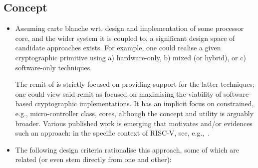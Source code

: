 
\subsection{Concept}
\label{sec:bg:concept}

\begin{itemize}

\item Assuming carte blanche wrt. design and implementation of some processor
      core, and the wider system it is coupled to, a significant design space 
      of candidate approaches exists.  For example, one could realise a given 
      cryptographic primitive using
      a) hardware-only,
      b) mixed (or hybrid),
         or
      c) software-only
      techniques.

      The remit of \XCRYPTO is strictly focused on providing support for the
      latter techniques; one could view said remit as focused on maximising 
      the viability of software-based cryptographic implementations.  It has
      an implicit focus on constrained, e.g., micro-controller class, cores, 
      although the concept and utility is arguably broader.
      Various published work is emerging that motivates and/or evidences such
      an approach: in the specific context of RISC-V,
      see, e.g.,~\cite{SCARV:Stoffelen:19}.

\item The following design criteria rationalise this approach, some of which
      are related (or even stem directly from one and other):


\end{itemize}
